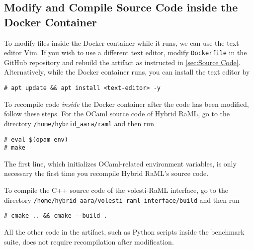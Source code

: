\subsection{Modify and Compile Source Code inside the Docker Container}

To modify files inside the Docker container while it runs, we can use the text
editor Vim.
%
If you wish to use a different text editor, modify \texttt{Dockerfile} in the
GitHub repository and rebuild the artifact as instructed in \cref{sec:Source
Code}.
%
Alternatively, while the Docker container runs, you can install the text
editor by
\begin{verbatim}
# apt update && apt install <text-editor> -y
\end{verbatim}

To recompile code \emph{inside} the Docker container after the code has been
modified, follow these steps.
%
For the OCaml source code of Hybrid RaML, go to the directory
\texttt{/home/hybrid\_aara/raml} and then run
\begin{verbatim}
# eval $(opam env)
# make
\end{verbatim}
%
The first line, which initializes OCaml-related environment variables, is only
necessary the first time you recompile Hybrid RaML's source code.

To compile the C++ source code of the volesti-RaML interface, go to the
directory \texttt{/home/hybrid\_aara/volesti\_raml\_interface/build} and then
run
\begin{verbatim}
# cmake .. && cmake --build .
\end{verbatim}

All the other code in the artifact, such as Python scripts inside the benchmark
suite, does not require recompilation after modification.
